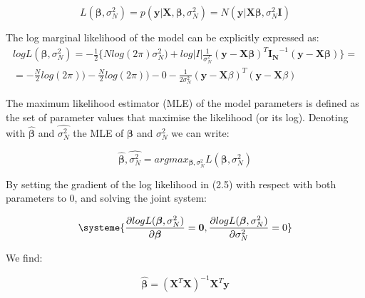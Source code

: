 \begin{equation} \label{eq4:Linear_regression_likelihood}
 L(\boldsymbol{\beta}, \sigma_N^2) = p(\mathbf{y}| \mathbf{X}, \boldsymbol{\beta}, \sigma_N^2) = N(\mathbf{y} | \mathbf{X}\boldsymbol{\beta}, \sigma_N^2 \mathbf{I}) 
\end{equation}

The log marginal likelihood of the model can be explicitly expressed as:\\

\begin{equation} \label{eq5:Linear_regression_log_likelihood}
\begin{split}
logL(\boldsymbol{\beta}, \sigma_N^2) = -\frac{1}{2} \bigg\{Nlog(2\pi)\sigma_N^2) + log|I| \frac{1}{\sigma_N^2}(\mathbf{y}-\mathbf{X}\boldsymbol{\beta})^T\mathbf{I_N}^{-1}(\mathbf{y}-\mathbf{X}\boldsymbol{\beta}) \bigg\}  = \\
= -\frac{N}{2}log(2\pi)) - \frac{N}{2}log(2\pi))- 0 - \frac{1}{2\sigma_N^2}(\mathbf{y}-\mathbf{X}\beta)^T(\mathbf{y}-\mathbf{X}\beta)  
\end{split}
\end{equation}

The maximum likelihood estimator (MLE) of the model parameters is defined as the set of parameter values that maximise the likelihood (or its log). Denoting with $\hat{\boldsymbol{\beta}}$ and $\hat{\sigma_N^2}$ the MLE of $\boldsymbol{\beta}$ and $\sigma_N^2$ we can write:

\begin{equation} \label{eq6:Linear_regression_MLEs}
\hat{\boldsymbol{\beta}},\hat{\sigma_N^2} = argmax_{\boldsymbol{\beta},\sigma_N^2}L(\boldsymbol{\beta}, \sigma_N^2) 
\end{equation} 

By setting the gradient of the log likelihood in (2.5) with respect with both parameters to 0, and solving the joint system:

\begin{equation} \label{eq7:Linear_regression_MLE_system}
\systeme{
    \dfrac{\partial logL(\boldsymbol{\beta}, \sigma_N^2)}{\partial \boldsymbol{\beta}} = \mathbf{0},
    \dfrac{\partial logL(\boldsymbol{\beta}, \sigma_N^2)}{\partial \sigma_N^2} = 0
    }
\end{equation}

We find:

\begin{equation} \label{eq8:Linear_regression_MLE_solution_beta}
\hat{\boldsymbol{\beta}} = (\mathbf{X}^T\mathbf{X})^{-1}\mathbf{X}^T\mathbf{y} 
\end{equation}

